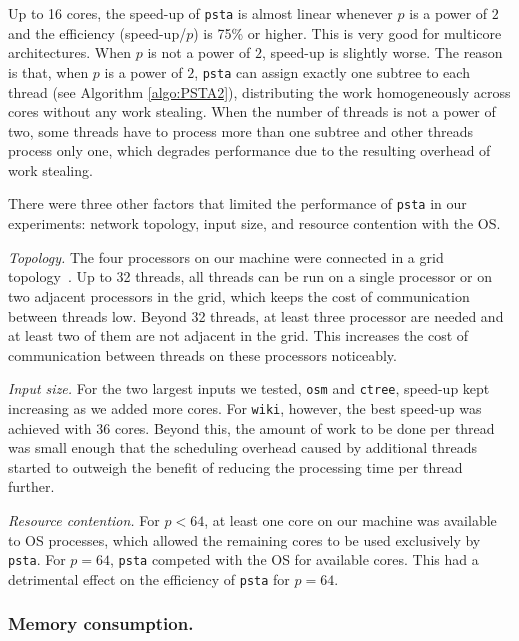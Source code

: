 Up to 16 cores, the speed-up of {\tt psta} is almost linear whenever $p$ is a
power of $2$ and the efficiency (speed-up/$p$) is 75\% or higher.
This is very good for multicore architectures.
When $p$ is not a power of $2$, speed-up is slightly worse.
The reason is that, when $p$ is a power of $2$, {\tt psta} can assign exactly
one subtree to each thread (see Algorithm \ref{algo:PSTA2}), distributing the
work homogeneously across cores without any work stealing.
When the number of threads is not a power of two, some threads have to process
more than one subtree and other threads process only one, which degrades
performance due to the resulting overhead of work stealing.

There were three other factors that limited the performance of {\tt psta} in
our experiments: network topology, input size, and resource contention with
the OS.

\textit{Topology.}
The four processors on our machine were connected in a grid
topology~\cite{Drepper2007}.
Up to 32 threads, all threads can be run on a single processor or on two
adjacent processors in the grid, which keeps the cost of communication between
threads low.
Beyond 32 threads, at least three processor are needed and
at least two of them are not adjacent in the grid.
This increases the cost of communication between threads on these processors
noticeably.

\textit{Input size.}
For the two largest inputs we tested, {\tt osm} and {\tt ctree}, speed-up
kept increasing as we added more cores.
For {\tt wiki}, however, the best speed-up was achieved with 36 cores.
Beyond this, the amount of work to be done per thread was small enough that
the scheduling overhead caused by additional threads started to outweigh the
benefit of reducing the processing time per thread further.

\textit{Resource contention.}
For $p < 64$, at least one core on our machine was available to OS processes,
which allowed the remaining cores to be used exclusively by {\tt psta}.
For $p = 64$, {\tt psta} competed with the OS for available cores.
This had a detrimental effect on the efficiency of {\tt psta} for $p = 64$.

\subsubsection{Memory consumption.}

